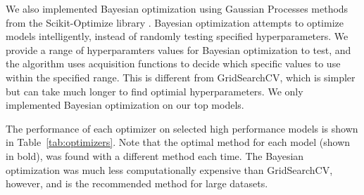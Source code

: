 \documentclass[twocolumn, nofootinbib, secnumarabic, amssymb, nobibnotes, aps, prd]{revtex4-2}
\begin{document}
We also implemented Bayesian optimization using Gaussian Processes methods from the Scikit-Optimize library \cite{head_tim_2021_5565057}. Bayesian optimization attempts to optimize models intelligently, instead of randomly testing specified hyperparameters. We provide a range of hyperparamters values for Bayesian optimization to test, and the algorithm uses acquisition functions to decide which specific values to use within the specified range. This is different from GridSearchCV, which is simpler but can take much longer to find optimial hyperparameters. We only implemented Bayesian optimization on our top models.

The performance of each optimizer on selected high performance models is shown in Table~\ref{tab:optimizers}. Note that the optimal method for each model (shown in bold), was found with a different method each time. The Bayesian optimization was much less computationally expensive than GridSearchCV, however, and is the recommended method for large datasets.
\end{document}
